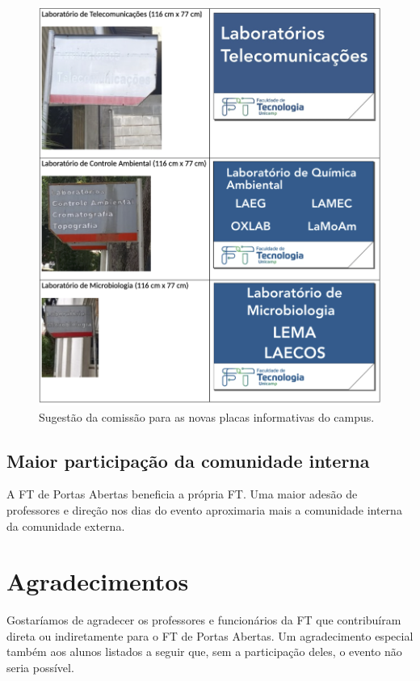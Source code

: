 \documentclass[
  letterpaper,
  DIV=11,
  numbers=noendperiod]{scrreprt}
\begin{document}
\begin{figure}[H]

{\centering \includegraphics[width=0.6\linewidth,height=\textheight,keepaspectratio]{recomendacoes/placas.png}

}

\caption{Sugestão da comissão para as novas placas informativas do
campus.}

\end{figure}%

\section{Maior participação da comunidade
interna}\label{maior-participauxe7uxe3o-da-comunidade-interna}

A FT de Portas Abertas beneficia a própria FT. Uma maior adesão de
professores e direção nos dias do evento aproximaria mais a comunidade
interna da comunidade externa.


\chapter{Agradecimentos}\label{agradecimentos}

Gostaríamos de agradecer os professores e funcionários da FT que
contribuíram direta ou indiretamente para o FT de Portas Abertas. Um
agradecimento especial também aos alunos listados a seguir que, sem a
participação deles, o evento não seria possível.
\end{document}
